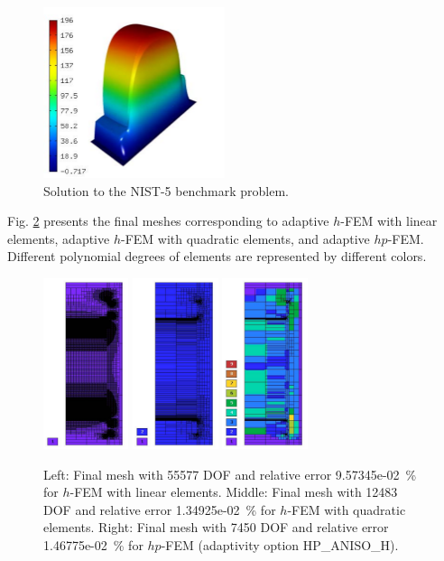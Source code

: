 \documentclass[12pt]{elsarticle}
\begin{document}
\begin{figure}[H]
\centering
\includegraphics[height=5cm]{mafig29.pdf}
\caption{Solution to the NIST-5 benchmark problem.}
\label{fig:sln-nist05}
\end{figure}

Fig. \ref{fig:nist-5-hp-aniso} presents the final meshes corresponding to adaptive $h$-FEM with
linear elements, adaptive $h$-FEM with quadratic elements, and adaptive $hp$-FEM. Different
polynomial degrees of elements are represented by different colors.

\begin{figure}[H]
\centering
\includegraphics[height=5cm]{mafig30.pdf}
\includegraphics[height=5cm]{mafig31.pdf}
\includegraphics[height=5cm]{mafig32.pdf}
\caption{
Left: Final mesh with 55577 DOF and relative error 9.57345e-02~\% for $h$-FEM with linear elements.
Middle: Final mesh with 12483 DOF and relative error 1.34925e-02~\% for $h$-FEM with quadratic elements.
Right: Final mesh with 7450 DOF and relative error 1.46775e-02~\% for $hp$-FEM (adaptivity option HP\_ANISO\_H).}
\label{fig:nist-5-hp-aniso}
\end{figure}
\end{document}
